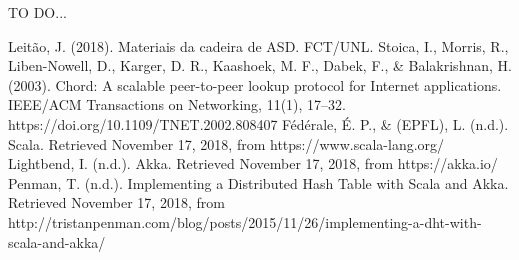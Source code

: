 \documentclass[12pt]{article}
\begin{document}
TO DO...

\newpage
\begin{thebibliography}{00}
 Leitão, J. (2018). Materiais da cadeira de ASD. FCT/UNL.
 Stoica, I., Morris, R., Liben-Nowell, D., Karger, D. R., Kaashoek, M. F., Dabek, F., \& Balakrishnan, H. (2003). Chord: A scalable peer-to-peer lookup protocol for Internet applications. IEEE/ACM Transactions on Networking, 11(1), 17–32. https://doi.org/10.1109/TNET.2002.808407
 Fédérale, É. P., \& (EPFL), L. (n.d.). Scala. Retrieved November 17, 2018, from https://www.scala-lang.org/
 Lightbend, I. (n.d.). Akka. Retrieved November 17, 2018, from https://akka.io/
 Penman, T. (n.d.). Implementing a Distributed Hash Table with Scala and Akka. Retrieved November 17, 2018, from http://tristanpenman.com/blog/posts/2015/11/26/implementing-a-dht-with-scala-and-akka/
\end{thebibliography}
\end{document}
